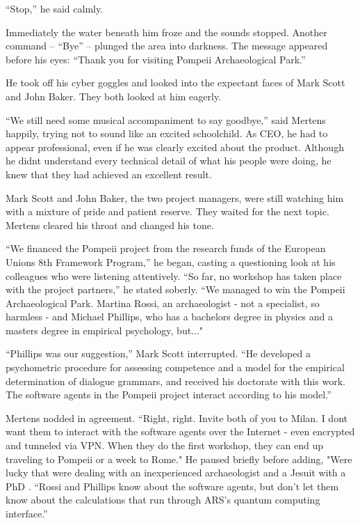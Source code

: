 \documentclass[
]{article}
\begin{document}
``Stop,'' he said calmly.

Immediately the water beneath him froze and the sounds stopped. Another
command -- ``Bye'' -- plunged the area into darkness. The message
appeared before his eyes: ``Thank you for visiting Pompeii
Archaeological Park.''

He took off his cyber goggles and looked into the expectant faces of
Mark Scott and John Baker. They both looked at him eagerly.

``We still need some musical accompaniment to say goodbye,'' said
Mertens happily, trying not to sound like an excited schoolchild. As
CEO, he had to appear professional, even if he was clearly excited about
the product. Although he didn\textquotesingle t understand every
technical detail of what his people were doing, he knew that they had
achieved an excellent result.

Mark Scott and John Baker, the two project managers, were still watching
him with a mixture of pride and patient reserve. They waited for the
next topic. Mertens cleared his throat and changed his tone.

``We financed the Pompeii project from the research funds of the
European Union\textquotesingle s 8th Framework Program,'' he began,
casting a questioning look at his colleagues who were listening
attentively. ``So far, no workshop has taken place with the project
partners,'' he stated soberly. ``We managed to win the Pompeii
Archaeological Park. Martina Rossi, an archaeologist - not a specialist,
so harmless - and Michael Phillips, who has a bachelor\textquotesingle s
degree in physics and a master\textquotesingle s degree in empirical
psychology, but..."

``Phillips was our suggestion,'' Mark Scott interrupted. ``He developed
a psychometric procedure for assessing competence and a model for the
empirical determination of dialogue grammars, and received his doctorate
with this work. The software agents in the Pompeii project interact
according to his model.''

Mertens nodded in agreement. ``Right, right. Invite both of you to
Milan. I don\textquotesingle t want them to interact with the software
agents over the Internet - even encrypted and tunneled via VPN. When
they do the first workshop, they can end up traveling to Pompeii or a
week to Rome." He paused briefly before adding, "We\textquotesingle re
lucky that we\textquotesingle re dealing with an inexperienced
archaeologist and a Jesuit with a PhD . ``Rossi and Phillips know about
the software agents, but don't let them know about the calculations that
run through ARS's quantum computing interface.''
\end{document}
